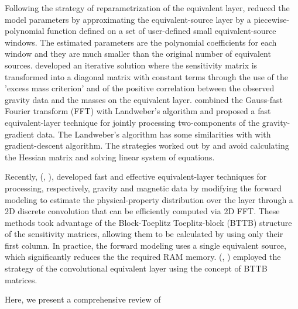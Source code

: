 Following the strategy of reparametrization of the equivalent layer, \cite{oliveirajr-etal2013} reduced the model parameters by approximating the equivalent-source layer by a piecewise-polynomial function defined on a set of user-defined small equivalent-source windows. The estimated parameters are the polynomial coefficients for each window and they are much smaller than the original number of equivalent sources. \cite{siqueira-etal2017} developed an iterative solution where the sensitivity matrix is transformed into a diagonal matrix with constant terms through the use of the 'excess mass criterion' and of the positive correlation between the observed gravity data and the masses on the equivalent layer. \cite{jirigalatu-ebbing2019} combined the Gauss-fast Fourier transform (FFT) with Landweber's algorithm and proposed a fast equivalent-layer technique for jointly processing two-components of the gravity-gradient data.
The Landweber's algorithm has some similarities with with gradient-descent algorithm. The strategies worked out by \cite{siqueira-etal2017} and \cite{jirigalatu-ebbing2019} avoid calculating the Hessian matrix and solving linear system of equations.

Recently, \citeauthor{takahashi2020} (\citeyear{takahashi2020}, \citeyear{takahashi2022}), developed fast and effective equivalent-layer techniques for processing, respectively,  gravity and magnetic data by modifying the forward modeling to estimate the physical-property distribution  over the layer through a 2D discrete convolution that can be efficiently computed via 2D FFT.
These methods took advantage of the Block-Toeplitz Toeplitz-block (BTTB) structure of the sensitivity matrices, allowing them to be calculated by using only their first column.
In practice, the forward modeling uses a single equivalent source, which significantly reduces the the required RAM memory. \citeauthor{takahashi2020} (\citeyear{takahashi2020}, \citeyear{takahashi2022}) employed the strategy of the convolutional equivalent layer using the concept of  BTTB matrices.

Here, we present a comprehensive review of
